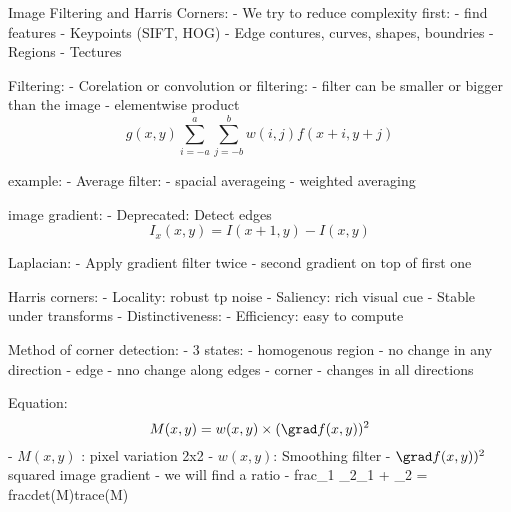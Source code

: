 Image Filtering and Harris Corners:
- We try to reduce complexity first:
 - find features
  - Keypoints (SIFT, HOG)
  - Edge contures, curves, shapes, boundries
  - Regions
  - Tectures


Filtering:
- Corelation or convolution or filtering:
- filter can be smaller or bigger than the image
- elementwise product
\[g(x,y) \sum^a_{i=-a} \sum^b_{j=-b} w(i,j)f(x+i, y+j)\]

example:
- Average filter:
 - spacial averageing
 - weighted averaging

image gradient:
 - Deprecated: Detect edges
 \[I_x(x,y) = I(x+1, y) - I(x,y)\]

Laplacian:
 - Apply gradient filter twice
 - second gradient on top of first one

Harris corners:
- Locality: robust tp noise
- Saliency: rich visual cue
- Stable under transforms
- Distinctiveness: 
- Efficiency: easy to compute

Method of corner detection:
- 3 states:
 - homogenous region
  - no change in any direction
 - edge
  - nno change along edges
 - corner
  - changes in all directions

Equation:
\[M(x,y) = w(x,y) \times (\grad f(x,y))^2\]
- $M(x,y)$ : pixel variation 2x2
- $ w(x,y)$: Smoothing filter
- $\grad f(x,y))^2$ squared image gradient
- we will find a ratio
 - frac{\lambda_1 \lambda_2}{\lambda_1 + \lambda_2} = frac{det(M)}{trace(M)}
